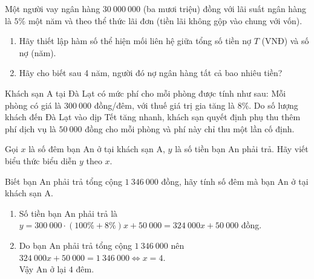 \begin{bt}%
	Một người vay ngân hàng $30~000~000$ (ba mươi triệu) đồng với lãi suất ngân hàng là $5 \%$ một năm và theo thể thức lãi đơn (tiền lãi không gộp vào chung với vốn).
	\begin{enumerate}
		\item Hãy thiết lập hàm số thể hiện mối liên hệ giữa tổng số tiền nợ $T$ (VNĐ) và số nợ (năm).
		\item Hãy cho biết sau 4 năm, người đó nợ ngân hàng tất cả bao nhiêu tiền?
	\end{enumerate}
\end{bt}


\begin{bt}%
	Khách sạn A tại Đà Lạt có mức phí cho mỗi phòng được tính như sau: Mỗi phòng có giá là $300\ 000$ đồng/đêm, với thuế giá trị gia tăng là $8\%$. Do số lượng khách đến Đà Lạt vào dịp Tết tăng nhanh, khách sạn quyết định phụ thu thêm phí dịch vụ là $50\ 000$ đồng cho mỗi phòng và phí này chỉ thu một lần cố định.
	\begin{listEX}[1]
		\item Gọi $x$ là số đêm bạn An ở tại khách sạn A, $y$ là số tiền bạn An phải trả. Hãy viết biểu thức biểu diễn $y$ theo $x$.
		\item Biết bạn An phải trả tổng cộng $1\ 346\ 000$ đồng, hãy tính số đêm mà bạn An ở tại khách sạn A. 
	\end{listEX}
	\loigiai 
	{
		\begin{enumerate}
			\item Số tiền bạn An phải trả là $y=300\ 000\cdot (100\%+8\%)x+50\ 000=324\ 000x+50\ 000$ đồng.
			\item Do bạn An phải trả tổng cộng $1\ 346\ 000$ nên $324\ 000x+50\ 000=1\ 346\ 000\Leftrightarrow x=4$.\\
			Vậy An ở lại $4$ đêm.
		\end{enumerate}
	}	
\end{bt}

